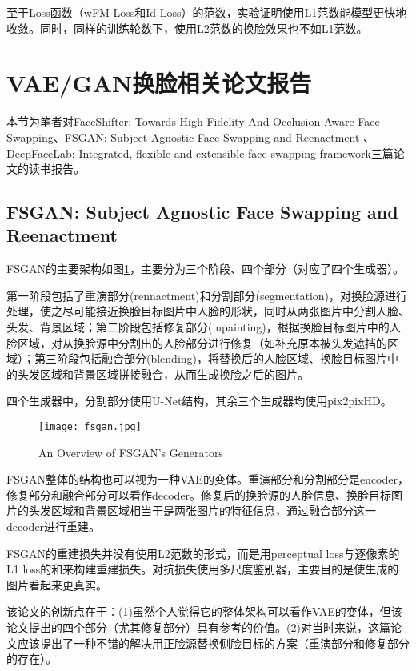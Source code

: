 \documentclass[a4paper]{article}
\begin{document}
\vspace{1em}
至于Loss函数（wFM Loss和Id Loss）的范数，实验证明使用L1范数能模型更快地收敛。同时，同样的训练轮数下，使用L2范数的换脸效果也不如L1范数。

\newpage

\section{VAE/GAN换脸相关论文报告}

本节为笔者对FaceShifter: Towards High Fidelity And Occlusion Aware Face Swapping\cite{faceshifter}、FSGAN: Subject Agnostic Face Swapping and Reenactment
\cite{fsgan}、DeepFaceLab: Integrated, flexible and extensible face-swapping framework\cite{deepface}三篇论文的读书报告。

\subsection{FSGAN: Subject Agnostic Face Swapping and Reenactment}

FSGAN的主要架构如图\ref{fsgan-fig}，主要分为三个阶段、四个部分（对应了四个生成器）。

第一阶段包括了重演部分(rennactment)和分割部分(segmentation)，对换脸源进行处理，使之尽可能接近换脸目标图片中人脸的形状，同时从两张图片中分割人脸、头发、背景区域；第二阶段包括修复部分(inpainting)，根据换脸目标图片中的人脸区域，对从换脸源中分割出的人脸部分进行修复（如补充原本被头发遮挡的区域）；第三阶段包括融合部分(blending)，将替换后的人脸区域、换脸目标图片中的头发区域和背景区域拼接融合，从而生成换脸之后的图片。

四个生成器中，分割部分使用U-Net结构，其余三个生成器均使用pix2pixHD。

\begin{figure}[htb]
  \centering
  \texttt{[image: fsgan.jpg]}
  \caption{An Overview of FSGAN's Generators \cite{fsgan}}
  \label{fsgan-fig}
\end{figure}

FSGAN整体的结构也可以视为一种VAE的变体。重演部分和分割部分是encoder，修复部分和融合部分可以看作decoder。修复后的换脸源的人脸信息、换脸目标图片的头发区域和背景区域相当于是两张图片的特征信息，通过融合部分这一decoder进行重建。

FSGAN的重建损失并没有使用L2范数的形式，而是用perceptual loss与逐像素的L1 loss的和来构建重建损失。对抗损失使用多尺度鉴别器，主要目的是使生成的图片看起来更真实。

该论文的创新点在于：(1)虽然个人觉得它的整体架构可以看作VAE的变体，但该论文提出的四个部分（尤其修复部分）具有参考的价值。(2)对当时来说，这篇论文应该提出了一种不错的解决用正脸源替换侧脸目标的方案（重演部分和修复部分的存在）。
\end{document}
